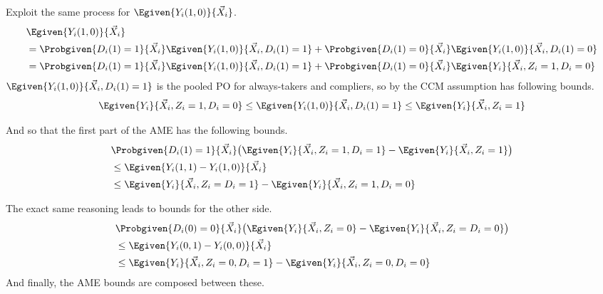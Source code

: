 Exploit the same process for $\Egiven{Y_i(1,0)}{\vec X_i}$.
\begin{align*}
    &\Egiven{Y_i(1,0)}{\vec X_i} \\
    &=
    \Probgiven{D_i(1) = 1}{\vec X_i }
        \Egiven{Y_i(1,0)}{\vec X_i, D_i(1) = 1}
    + \Probgiven{D_i(1) = 0}{\vec X_i }
        \Egiven{Y_i(1,0)}{\vec X_i, D_i(1) = 0} \\
    &=
    \Probgiven{D_i(1) = 1}{\vec X_i }
        \Egiven{Y_i(1,0)}{\vec X_i, D_i(1) = 1}
    + \Probgiven{D_i(1) = 0}{\vec X_i }
        \Egiven{Y_i}{\vec X_i, Z_i = 1, D_i = 0}
\end{align*}
$\Egiven{Y_i(1,0)}{\vec X_i, D_i(1) = 1}$ is the pooled PO for always-takers and compliers, so by the CCM assumption has following bounds.
\[
    \Egiven{Y_i}{\vec X_i, Z_i = 1, D_i = 0}
    \leq 
    \Egiven{Y_i(1,0)}{\vec X_i, D_i(1) = 1} 
    \leq 
    \Egiven{Y_i}{\vec X_i, Z_i = 1}
\]

And so that the first part of the AME has the following bounds.
\begin{align*}
    &\Probgiven{D_i(1) = 1}{\vec X_i } \big( 
        \Egiven{Y_i}{\vec X_i, Z_i = 1, D_i = 1}
        - \Egiven{Y_i}{\vec X_i, Z_i = 1}
    \big) \\
    &\leq
    \Egiven{Y_i(1,1) - Y_i(1,0)}{\vec X_i} \\
    &\leq
    \Egiven{Y_i}{\vec X_i, Z_i = D_i = 1}
        - \Egiven{Y_i}{\vec X_i, Z_i = 1, D_i = 0}
\end{align*}

The exact same reasoning leads to bounds for the other side.
\begin{align*}
    &\Probgiven{D_i(0) = 0}{\vec X_i } \big( 
        \Egiven{Y_i}{\vec X_i, Z_i = 0}
        - \Egiven{Y_i}{\vec X_i, Z_i = D_i = 0}
    \big) \\
    &\leq
    \Egiven{Y_i(0,1) - Y_i(0,0)}{\vec X_i} \\
    &\leq
    \Egiven{Y_i}{\vec X_i, Z_i = 0, D_i = 1}
        - \Egiven{Y_i}{\vec X_i, Z_i = 0, D_i = 0}
\end{align*}
And finally, the AME bounds are composed between these.
